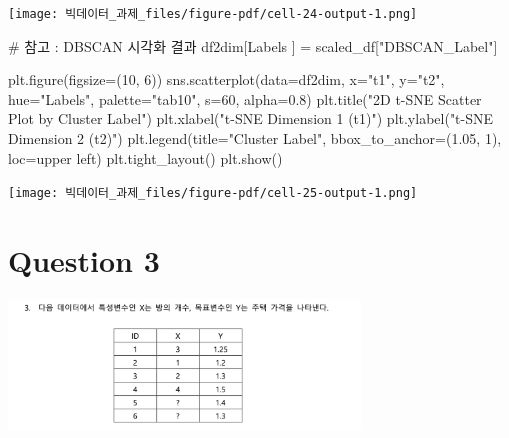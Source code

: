 \documentclass[
  a4paper,
  DIV=11,
  numbers=noendperiod]{scrreprt}
\newenvironment{Shaded}{\begin{snugshade}}{\end{snugshade}}
\newcommand{\CommentTok}[1]{\textcolor[rgb]{0.37,0.37,0.37}{#1}}
\newcommand{\DecValTok}[1]{\textcolor[rgb]{0.68,0.00,0.00}{#1}}
\newcommand{\FloatTok}[1]{\textcolor[rgb]{0.68,0.00,0.00}{#1}}
\newcommand{\NormalTok}[1]{\textcolor[rgb]{0.00,0.23,0.31}{#1}}
\newcommand{\OperatorTok}[1]{\textcolor[rgb]{0.37,0.37,0.37}{#1}}
\newcommand{\StringTok}[1]{\textcolor[rgb]{0.13,0.47,0.30}{#1}}
\begin{document}
\texttt{[image: 빅데이터\_과제\_files/figure-pdf/cell-24-output-1.png]}

\begin{Shaded}
\begin{Highlighting}[]
\CommentTok{\# 참고 : DBSCAN 시각화 결과}
\NormalTok{df2dim[}\StringTok{\textquotesingle{}Labels\textquotesingle{}}\NormalTok{ ] }\OperatorTok{=}\NormalTok{ scaled\_df[}\StringTok{"DBSCAN\_Label"}\NormalTok{]}

\NormalTok{plt.figure(figsize}\OperatorTok{=}\NormalTok{(}\DecValTok{10}\NormalTok{, }\DecValTok{6}\NormalTok{))}
\NormalTok{sns.scatterplot(data}\OperatorTok{=}\NormalTok{df2dim, x}\OperatorTok{=}\StringTok{"t1"}\NormalTok{, y}\OperatorTok{=}\StringTok{"t2"}\NormalTok{, hue}\OperatorTok{=}\StringTok{"Labels"}\NormalTok{, palette}\OperatorTok{=}\StringTok{"tab10"}\NormalTok{, s}\OperatorTok{=}\DecValTok{60}\NormalTok{, alpha}\OperatorTok{=}\FloatTok{0.8}\NormalTok{)}
\NormalTok{plt.title(}\StringTok{"2D t{-}SNE Scatter Plot by Cluster Label"}\NormalTok{)}
\NormalTok{plt.xlabel(}\StringTok{"t{-}SNE Dimension 1 (t1)"}\NormalTok{)}
\NormalTok{plt.ylabel(}\StringTok{"t{-}SNE Dimension 2 (t2)"}\NormalTok{)}
\NormalTok{plt.legend(title}\OperatorTok{=}\StringTok{"Cluster Label"}\NormalTok{, bbox\_to\_anchor}\OperatorTok{=}\NormalTok{(}\FloatTok{1.05}\NormalTok{, }\DecValTok{1}\NormalTok{), loc}\OperatorTok{=}\StringTok{\textquotesingle{}upper left\textquotesingle{}}\NormalTok{)}
\NormalTok{plt.tight\_layout()}
\NormalTok{plt.show()}
\end{Highlighting}
\end{Shaded}

\texttt{[image: 빅데이터\_과제\_files/figure-pdf/cell-25-output-1.png]}

\section{Question 3}\label{question-3}

\begin{center}
\includegraphics[width=0.7\textwidth,height=\textheight]{image/bigdata3.png}
\end{center}
\end{document}

